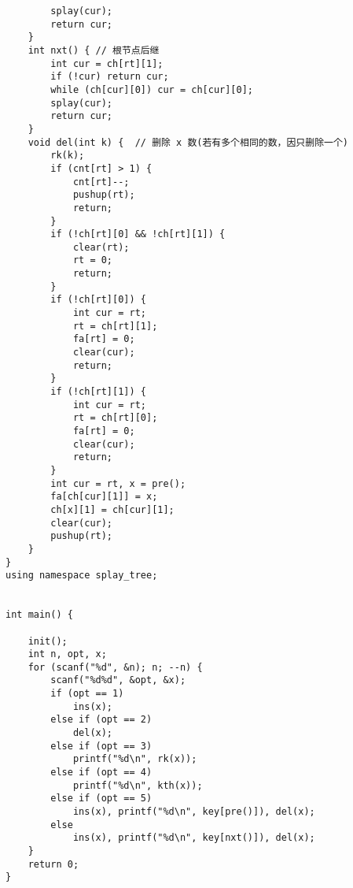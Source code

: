 \begin{verbatim}
        splay(cur);
        return cur;
    }
    int nxt() { // 根节点后继
        int cur = ch[rt][1];
        if (!cur) return cur;
        while (ch[cur][0]) cur = ch[cur][0];
        splay(cur);
        return cur;
    }
    void del(int k) {  // 删除 x 数(若有多个相同的数，因只删除一个)
        rk(k);
        if (cnt[rt] > 1) {
            cnt[rt]--;
            pushup(rt);
            return;
        }
        if (!ch[rt][0] && !ch[rt][1]) {
            clear(rt);
            rt = 0;
            return;
        }
        if (!ch[rt][0]) {
            int cur = rt;
            rt = ch[rt][1];
            fa[rt] = 0;
            clear(cur);
            return;
        }
        if (!ch[rt][1]) {
            int cur = rt;
            rt = ch[rt][0];
            fa[rt] = 0;
            clear(cur);
            return;
        }
        int cur = rt, x = pre();
        fa[ch[cur][1]] = x;
        ch[x][1] = ch[cur][1];
        clear(cur);
        pushup(rt);
    }
}
using namespace splay_tree;


int main() {

    init();
    int n, opt, x;
    for (scanf("%d", &n); n; --n) {
        scanf("%d%d", &opt, &x);
        if (opt == 1)
            ins(x);
        else if (opt == 2)
            del(x);
        else if (opt == 3)
            printf("%d\n", rk(x));
        else if (opt == 4)
            printf("%d\n", kth(x));
        else if (opt == 5)
            ins(x), printf("%d\n", key[pre()]), del(x);
        else
            ins(x), printf("%d\n", key[nxt()]), del(x);
    }
    return 0;
}
\end{verbatim}

